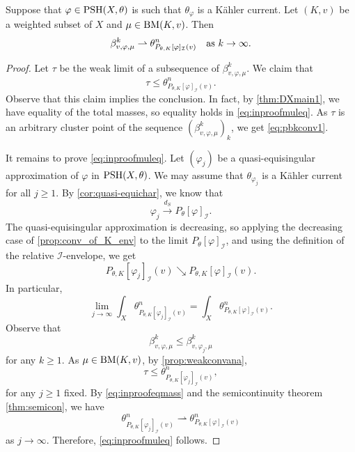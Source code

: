 \begin{proposition} \label{prop:mainKahcurr}
Suppose that $\varphi \in \mathrm{PSH}(X,\theta)$ is such that $\theta_{\varphi}$ is a Kähler current.
Let $(K,v)$ be a weighted subset of $X$ and $\mu\in \mathrm{BM}(K,v)$. Then
\begin{equation}\label{eq:pbkconv1}
\beta^k_{v,\varphi,\mu} \rightharpoonup \theta_{P_{\theta,K}[\varphi]_{\mathcal{I}}(v)}^n\quad \textup{as } k\to\infty.
\end{equation}
\end{proposition}
\begin{proof} Let $\tau$ be the weak limit of a subsequence of $\beta^k_{v,\varphi,\mu}$. We claim that
\begin{equation}\label{eq:inproofmuleq}
\tau\leq \theta_{P_{\theta,K}[\varphi]_{\mathcal{I}}(v)}^n.
\end{equation}
Observe that this claim implies the conclusion. In fact, by \cref{thm:DXmain1}, we have equality of the total masses, so equality holds in \eqref{eq:inproofmuleq}. As $\tau$ is an arbitrary cluster point of the sequence $(\beta^k_{v,\varphi,\mu})_k$, we get \eqref{eq:pbkconv1}.

It remains to prove \eqref{eq:inproofmuleq}.
Let $(\varphi_j)$ be a quasi-equisingular approximation of $\varphi$ in $\mathrm{PSH}(X,\theta)$. We may assume that $\theta_{\varphi_j}$ is a K\"ahler current for all $j\geq 1$.
By \cref{cor:quasi-equichar}, we know that
\[
\varphi_j\xrightarrow{d_S}P_{\theta}[\varphi]_{\mathcal{I}}.
\]
The quasi-equisingular approximation is decreasing, so applying the decreasing case of \cref{prop:conv_of_K_env} to the limit $P_{\theta}[\varphi]_{\mathcal{I}}$, and using the definition of the relative $\mathcal{I}$-envelope, we get
\[
P_{\theta,K}\left[\varphi_j\right]_{\mathcal{I}}(v)\searrow P_{\theta,K}[\varphi]_{\mathcal{I}}(v).
\]
In particular,
\begin{equation}\label{eq:inproofeqmass}
\lim_{j\to\infty} \int_X \theta_{P_{\theta,K}\left[\varphi_j\right]_{\mathcal{I}}(v)}^n= \int_X  \theta_{P_{\theta,K}[\varphi]_{\mathcal{I}}(v)}^n.
\end{equation}
Observe that
\[
\beta^k_{v,\varphi,\mu} \leq \beta^k_{v,\varphi_j,\mu}
\]
for any $k \geq 1$.
As $\mu\in \mathrm{BM}(K,v)$,
by \cref{prop:weakconvana},
\[
\tau \leq \theta_{P_{\theta,K}[\varphi_j]_{\mathcal{I}}(v)}^n,
\]
for any $j \geq 1$ fixed.
By \eqref{eq:inproofeqmass} and the semicontinuity theorem \cref{thm:semicon}, we have
\[
\theta_{P_{\theta,K}\left[\varphi_j\right]_{\mathcal{I}}(v)}^n\rightharpoonup \theta_{P_{\theta,K}[\varphi]_{\mathcal{I}}(v)}^n
\]
as $j\to\infty$. Therefore, \eqref{eq:inproofmuleq} follows.
\end{proof}





